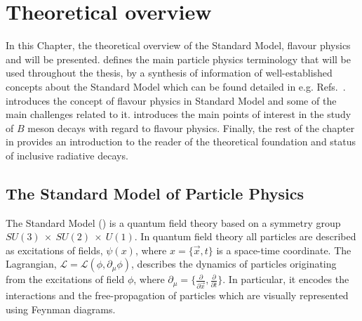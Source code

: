 \chapter{Theoretical overview}\label{ch:theory}

In this Chapter, the theoretical overview of the Standard Model, 
flavour physics and \BtoXsgamma will be presented.
 defines the main particle physics terminology that will be used throughout the thesis, by a synthesis of 
information of well-established concepts about the Standard Model which can be found detailed in e.g. Refs.~\cite{Peskin:1995ev,Thomson:2013zua,Griffiths:2008zz}.
 introduces the concept of flavour physics in Standard Model and some of the main challenges related to it.
 introduces the main points of interest in the study of $B$ meson decays with regard to flavour physics.
Finally, the rest of the chapter in  provides an introduction to the reader of the theoretical foundation and status of inclusive radiative decays.


\section{The Standard Model of Particle Physics} \label{sec:standard_model}
\begin{sloppy}
The Standard Model (\SM) is a quantum field theory based on a symmetry group $SU(3)~\times~SU(2)~\times~U(1)$.
In quantum field theory all particles are described as excitations of fields, $\psi(x)$, 
where $x=\{\vec{x},t\}$ is a space-time coordinate.
The Lagrangian, $\mathcal{L}=\mathcal{L}(\phi,\partial_{\mu}\phi)$, describes the dynamics of particles originating from the excitations of field $\phi$,
where $\partial_{\mu}=\{\frac{\partial}{\partial \vec{x}},\frac{\partial}{\partial t}\}$.
In particular, it encodes the interactions and the free-propagation of particles which are visually represented using Feynman diagrams.
\end{sloppy}

